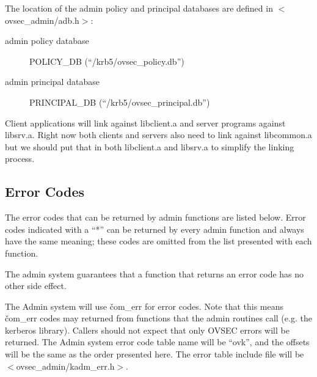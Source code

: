The location of the admin policy and principal databases are defined
in $<$ovsec_admin/adb.h$>$:

\begin{description}
\item[admin policy database] POLICY_DB (``/krb5/ovsec_policy.db'')
\item[admin principal database] PRINCIPAL_DB (``/krb5/ovsec_principal.db'')
\end{description}

Client applications will link against libclient.a and server programs
against libsrv.a. Right now both clients and servers also need to link
against libcommon.a but we should put that in both libclient.a and
libsrv.a to simplify the linking process.

\subsection{Error Codes}

The error codes that can be returned by admin functions are listed
below.  Error codes indicated with a ``*'' can be returned by every
admin function and always have the same meaning; these codes are
omitted from the list presented with each function.  

The admin system guarantees that a function that returns an error code
has no other side effect.

The Admin system will use \v{com_err} for error codes.  Note that this
means \v{com_err} codes may returned from functions that the admin
routines call (e.g. the kerberos library). Callers should not expect
that only OVSEC errors will be returned.  The Admin system error code
table name will be ``ovk'', and the offsets will be the same as the
order presented here. The error table include file will be
$<$ovsec_admin/kadm_err.h$>$.


